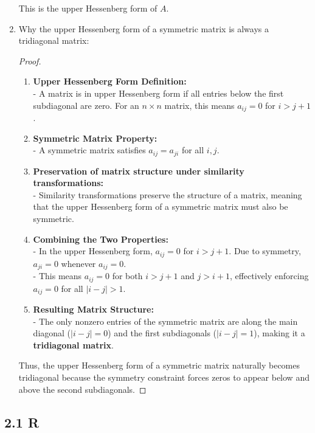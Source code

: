 \documentclass[12pt]{article}
\begin{document}
\begin{enumerate}[label=(\alph*)]
        This is the upper Hessenberg form of $A$.
    \item Why the upper Hessenberg form of a symmetric matrix is always a tridiagonal matrix:
        \begin{proof} $ $\newline
            \begin{enumerate}[label=(\roman*)]
                \item \textbf{Upper Hessenberg Form Definition:}\\
                - A matrix is in upper Hessenberg form if all entries below the first subdiagonal are zero. For an \( n \times n \) matrix, this means \( a_{ij} = 0 \) for \( i > j + 1 \).
             
                \item \textbf{Symmetric Matrix Property:}\\
                - A symmetric matrix satisfies \( a_{ij} = a_{ji} \) for all \( i, j \).
                
                \item \textbf{Preservation of matrix structure under similarity transformations:}\\
                - Similarity transformations preserve the structure of a matrix, meaning that the upper Hessenberg form of a symmetric matrix must also be symmetric.

                \item \textbf{Combining the Two Properties:}\\
                - In the upper Hessenberg form, \( a_{ij} = 0 \) for \( i > j + 1 \). Due to symmetry, \( a_{ji} = 0 \) whenever \( a_{ij} = 0 \). \\
                - This means \( a_{ij} = 0 \) for both \( i > j + 1 \) and \( j > i + 1 \), effectively enforcing \( a_{ij} = 0 \) for all \( |i - j| > 1 \).
             
                \item \textbf{Resulting Matrix Structure:}\\
                - The only nonzero entries of the symmetric matrix are along the main diagonal (\( |i - j| = 0 \)) and the first subdiagonals (\( |i - j| = 1 \)), making it a \textbf{tridiagonal matrix}.
            \end{enumerate}
            Thus, the upper Hessenberg form of a symmetric matrix naturally becomes tridiagonal because the symmetry constraint forces zeros to appear below and above the second subdiagonals.
        \end{proof}
\end{enumerate}
\subsection{2.1 R}
\end{document}

